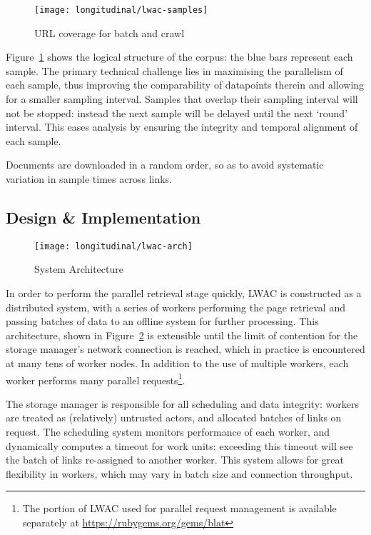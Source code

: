 \begin{figure}[Ht]
    \centering
    \texttt{[image: longitudinal/lwac-samples]}
    \caption{URL coverage for batch and crawl}
    \label{fig:longitudinal:lwac:samples}
\end{figure}


Figure~\ref{fig:longitudinal:lwac:samples} shows the logical structure of the corpus: the blue bars represent each sample.  The primary technical challenge lies in maximising the parallelism of each sample, thus improving the comparability of datapoints therein and allowing for a smaller sampling interval.  Samples that overlap their sampling interval will not be stopped: instead the next sample will be delayed until the next `round' interval.  This eases analysis by ensuring the integrity and temporal alignment of each sample.

Documents are downloaded in a random order, so as to avoid systematic variation in sample times across links.



\subsection{Design \& Implementation}


\begin{figure}[Ht]
    \centering
    \texttt{[image: longitudinal/lwac-arch]}
    \caption{System Architecture}
    \label{fig:longitudinal:lwac:arch}
\end{figure}


In order to perform the parallel retrieval stage quickly, LWAC is constructed as a distributed system, with a series of workers performing the page retrieval and passing batches of data to an offline system for further processing.  This architecture, shown in Figure~\ref{fig:longitudinal:lwac:arch} is extensible until the limit of contention for the storage manager's network connection is reached, which in practice is encountered at many tens of worker nodes.  In addition to the use of multiple workers, each worker performs many parallel requests\footnote{The portion of LWAC used for parallel request management is available separately at \url{https://rubygems.org/gems/blat}}.

The storage manager is responsible for all scheduling and data integrity: workers are treated as (relatively) untrusted actors, and allocated batches of links on request.  The scheduling system monitors performance of each worker, and dynamically computes a timeout for work units: exceeding this timeout will see the batch of links re-assigned to another worker.  This system allows for great flexibility in workers, which may vary in batch size and connection throughput.


